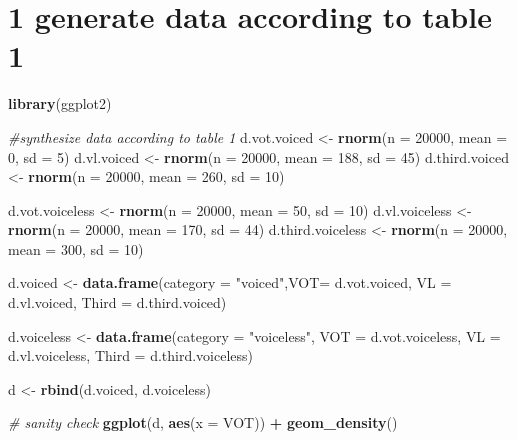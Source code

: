 \documentclass[
]{article}
\newenvironment{Shaded}{\begin{snugshade}}{\end{snugshade}}
\newcommand{\AttributeTok}[1]{\textcolor[rgb]{0.13,0.29,0.53}{#1}}
\newcommand{\CommentTok}[1]{\textcolor[rgb]{0.56,0.35,0.01}{\textit{#1}}}
\newcommand{\DecValTok}[1]{\textcolor[rgb]{0.00,0.00,0.81}{#1}}
\newcommand{\FunctionTok}[1]{\textcolor[rgb]{0.13,0.29,0.53}{\textbf{#1}}}
\newcommand{\NormalTok}[1]{#1}
\newcommand{\OtherTok}[1]{\textcolor[rgb]{0.56,0.35,0.01}{#1}}
\newcommand{\SpecialCharTok}[1]{\textcolor[rgb]{0.81,0.36,0.00}{\textbf{#1}}}
\newcommand{\StringTok}[1]{\textcolor[rgb]{0.31,0.60,0.02}{#1}}
\begin{document}
\section{1 generate data according to table
1}\label{generate-data-according-to-table-1}

\begin{Shaded}
\begin{Highlighting}[]
\FunctionTok{library}\NormalTok{(ggplot2)}

\CommentTok{\#synthesize data according to table 1}
\NormalTok{d.vot.voiced }\OtherTok{\textless{}{-}} \FunctionTok{rnorm}\NormalTok{(}\AttributeTok{n =} \DecValTok{20000}\NormalTok{, }\AttributeTok{mean =} \DecValTok{0}\NormalTok{, }\AttributeTok{sd =} \DecValTok{5}\NormalTok{)}
\NormalTok{d.vl.voiced }\OtherTok{\textless{}{-}} \FunctionTok{rnorm}\NormalTok{(}\AttributeTok{n =} \DecValTok{20000}\NormalTok{, }\AttributeTok{mean =} \DecValTok{188}\NormalTok{, }\AttributeTok{sd =} \DecValTok{45}\NormalTok{)}
\NormalTok{d.third.voiced }\OtherTok{\textless{}{-}} \FunctionTok{rnorm}\NormalTok{(}\AttributeTok{n =} \DecValTok{20000}\NormalTok{, }\AttributeTok{mean =} \DecValTok{260}\NormalTok{, }\AttributeTok{sd =} \DecValTok{10}\NormalTok{)}

\NormalTok{d.vot.voiceless }\OtherTok{\textless{}{-}} \FunctionTok{rnorm}\NormalTok{(}\AttributeTok{n =} \DecValTok{20000}\NormalTok{, }\AttributeTok{mean =} \DecValTok{50}\NormalTok{, }\AttributeTok{sd =} \DecValTok{10}\NormalTok{)}
\NormalTok{d.vl.voiceless }\OtherTok{\textless{}{-}} \FunctionTok{rnorm}\NormalTok{(}\AttributeTok{n =} \DecValTok{20000}\NormalTok{, }\AttributeTok{mean =} \DecValTok{170}\NormalTok{, }\AttributeTok{sd =} \DecValTok{44}\NormalTok{)}
\NormalTok{d.third.voiceless }\OtherTok{\textless{}{-}} \FunctionTok{rnorm}\NormalTok{(}\AttributeTok{n =} \DecValTok{20000}\NormalTok{, }\AttributeTok{mean =} \DecValTok{300}\NormalTok{, }\AttributeTok{sd =} \DecValTok{10}\NormalTok{)}

\NormalTok{d.voiced }\OtherTok{\textless{}{-}} \FunctionTok{data.frame}\NormalTok{(}\AttributeTok{category =} \StringTok{"voiced"}\NormalTok{,}\AttributeTok{VOT=}\NormalTok{ d.vot.voiced, }
                       \AttributeTok{VL =}\NormalTok{ d.vl.voiced, }\AttributeTok{Third  =}\NormalTok{ d.third.voiced)}

\NormalTok{d.voiceless }\OtherTok{\textless{}{-}} \FunctionTok{data.frame}\NormalTok{(}\AttributeTok{category =} \StringTok{"voiceless"}\NormalTok{, }\AttributeTok{VOT =}\NormalTok{ d.vot.voiceless, }
                          \AttributeTok{VL =}\NormalTok{ d.vl.voiceless, }\AttributeTok{Third =}\NormalTok{ d.third.voiceless)}

\NormalTok{d }\OtherTok{\textless{}{-}} \FunctionTok{rbind}\NormalTok{(d.voiced, d.voiceless)}

\CommentTok{\# sanity check}
\FunctionTok{ggplot}\NormalTok{(d, }\FunctionTok{aes}\NormalTok{(}\AttributeTok{x =}\NormalTok{ VOT)) }\SpecialCharTok{+}
  \FunctionTok{geom\_density}\NormalTok{()}
\end{Highlighting}
\end{Shaded}
\end{document}
